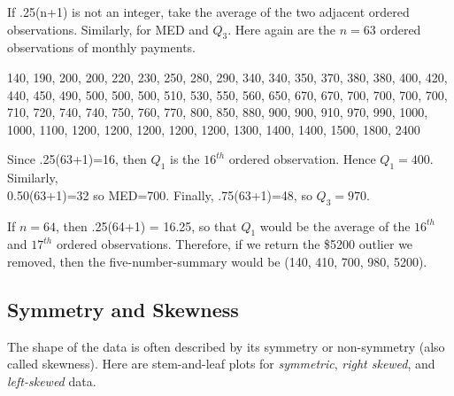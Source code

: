 \documentclass[11pt]{book}\usepackage[]{graphicx}\usepackage[]{color}
\begin{document}
If .25(n+1) is not an integer, take the average of the two adjacent ordered observations.  Similarly, for MED and $Q_3$.  Here again are the $n = 63$ ordered observations of monthly payments.

{\small{
140, 190, 200, 200, 220, 230, 250, 280, 290, 340, 340, 350, 370, 380, 380, 400, 420, 440, 450, 490, 500, 500, 500, 510, 530, 550, 560, 650, 670, 670, 700, 700, 700, 700, 710, 720, 740, 740, 750, 760, 770, 800, 850, 880, 900, 900, 910, 970, 990, 1000, 1000, 1100, 1200, 1200, 1200, 1200, 1200, 1300, 1400, 1400, 1500, 1800, 2400
}}


Since .25(63+1)=16, then $Q_1$ is the $16^{th}$ ordered observation.  Hence $Q_1 = 400$.  Similarly, \\ 0.50(63+1)=32 so MED=700.  Finally, .75(63+1)=48, so $Q_3 = 970$.

If $n = 64$, then .25(64+1) = 16.25, so that $Q_1$ would be the average of the $16^{th}$ and $17^{th}$ ordered observations.  Therefore, if we return the \$5200 outlier we removed, then the five-number-summary would be (140, 410, 700, 980, 5200).

\subsection{Symmetry and Skewness}

The shape of the data is often described by its symmetry or non-symmetry (also called skewness).  Here are stem-and-leaf plots for \textit{symmetric}, \textit{right skewed}, and \textit{left-skewed} data.

\vspace{3mm}
\end{document}
